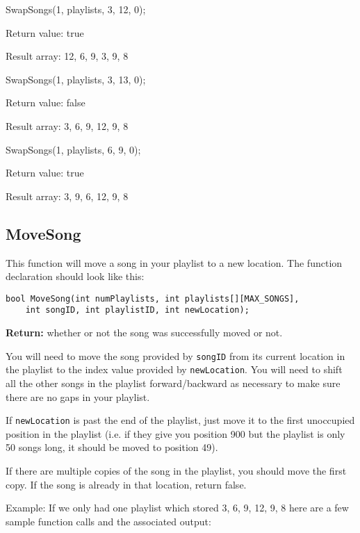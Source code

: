\begin{sample}
SwapSongs(1, playlists, 3, 12, 0);

Return value: true

Result array: {12, 6, 9, 3, 9, 8}
\end{sample}

\begin{sample}
SwapSongs(1, playlists, 3, 13, 0);

Return value: false

Result array: {3, 6, 9, 12, 9, 8}
\end{sample}

\begin{sample}
SwapSongs(1, playlists, 6, 9, 0);

Return value: true

Result array: {3, 9, 6, 12, 9, 8}
\end{sample}

\subsection{MoveSong \star \star \star}
This function will move a song in your playlist to a new location. The function declaration should look like this:

\begin{verbatim}
bool MoveSong(int numPlaylists, int playlists[][MAX_SONGS], 
    int songID, int playlistID, int newLocation);
\end{verbatim}

\textbf{Return:} whether or not the song was successfully moved or not.

You will need to move the song provided by \texttt{songID} from its current location in the playlist to the index value provided by \texttt{newLocation}. You will need to shift all the other songs in the playlist forward/backward as necessary to make sure there are no gaps in your playlist. 

If \texttt{newLocation} is past the end of the playlist, just move it to the first unoccupied position in the playlist (i.e. if they give you position 900 but the playlist is only 50 songs long, it should be moved to position 49). 

If there are multiple copies of the song in the playlist, you should move the first copy. If the song is already in that location, return false. 

Example: If we only had one playlist which stored {3, 6, 9, 12, 9, 8} here are a few sample function calls and the associated output:

